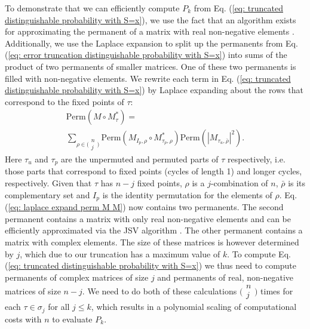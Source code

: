 \documentclass[10pt,aps,pra,twocolumn,superscriptaddress]{revtex4-2}
\begin{document}
To demonstrate that we can efficiently compute $P_k$ from Eq. (\ref{eq: truncated distinguishable probability with S=x}), we use the fact that an algorithm exists for approximating the permanent of a matrix with real non-negative elements \cite{JSV_algorithm}. Additionally, we use the Laplace expansion to split up the permanents from Eq. (\ref{eq: error truncation distinguishable probability with S=x}) into sums of the product of two permanents of smaller matrices. One of these two permanents is filled with non-negative elements.
We rewrite each term in Eq. (\ref{eq: truncated distinguishable probability with S=x}) by Laplace expanding
about the rows that correspond to the fixed points of $\tau$:
\begin{multline}
        \text{Perm} (M \circ M^*_{\tau})=\\ \sum_{\rho \in \big(\begin{smallmatrix}
n \\
j 
\end{smallmatrix}\big)} \text{Perm} (M_{I_{p},\rho} \circ M^*_{\tau_{p},\rho})\text{Perm}( |M_{\tau_u,\bar{\rho}}|^2).
    \label{eq: laplace expand perm M M}
\end{multline}
Here $\tau_u$ and $\tau_p$ are the unpermuted and permuted parts of $\tau$ respectively, i.e. those parts that correspond to fixed points (cycles of length 1) and longer cycles, respectively. Given that $\tau$ has $n-j$ fixed points, $\rho$ is a $j$-combination of $n$, $\bar{\rho}$ is its complementary set and $I_{p}$ is the identity permutation for the elements of $\rho$. 
Eq. (\ref{eq: laplace expand perm M M}) now contains two permanents. The second permanent contains a matrix with only real non-negative elements and can be efficiently approximated via the JSV algorithm \cite{JSV_algorithm}. The other permanent contains a matrix with complex elements. The size of these matrices is however determined by $j$, which due to our truncation has a maximum value of $k$.
To compute Eq. (\ref{eq: truncated distinguishable probability with S=x}) we thus need to compute permanents of complex matrices of size $j$ and permanents of real, non-negative matrices of size $n-j$. We need to do both of these calculations $\big(\begin{smallmatrix}
n \\
j 
\end{smallmatrix}\big)$ times for each $\tau\in\sigma_j$ for all $j\leq k$, which results in a polynomial scaling of computational costs with $n$ to evaluate $P_k$. 
\end{document}
